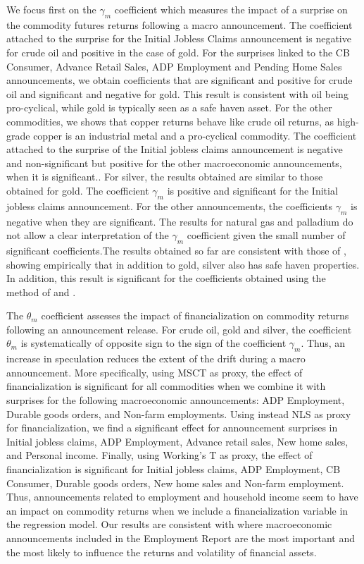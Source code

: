 \documentclass[12pt]{article}
\begin{document}
We focus first on the $\gamma_m$ coefficient which measures the impact of a surprise on the commodity futures returns following a macro announcement. The coefficient attached to the surprise for the Initial Jobless Claims announcement is negative for crude oil and positive in the case of gold. For the surprises linked to the CB Consumer, Advance Retail Sales, ADP Employment and Pending Home Sales announcements, we obtain coefficients that are significant and positive for crude oil and significant and negative for gold. This result is consistent with oil being pro-cyclical, while gold is typically seen as a safe haven asset. For the other commodities, we shows that copper returns behave like crude oil returns, as high-grade copper is an industrial metal and a pro-cyclical commodity. The coefficient attached to the surprise of the Initial jobless claims announcement is negative and non-significant but positive for the other macroeconomic announcements, when it is significant.. For silver, the results obtained are similar to those obtained for gold. The coefficient $\gamma_m$ is positive and significant for the Initial jobless claims announcement. For the other announcements, the coefficients $\gamma_m$ is negative when they are significant. The results for natural gas and palladium do not allow a clear interpretation of the $\gamma_m$ coefficient given the small number of significant coefficients.The results obtained so far are consistent with those of \citet{lucey2015precious}, showing empirically that in addition to gold, silver also has safe haven properties.
In addition, this result is significant for the coefficients obtained using the method of \citet{kurov2019price} and \citet{andersen2007real}.

The $\theta_m$ coefficient assesses the impact of financialization on commodity returns following an announcement release. For crude oil, gold and silver, the coefficient $\theta_m$ is systematically of opposite sign to the sign of the coefficient $\gamma_m$. Thus, an increase in speculation reduces the extent of the drift during a macro  announcement. More specifically, using MSCT as proxy, the effect of financialization is significant for all commodities when we combine it with surprises for the following macroeconomic announcements: ADP Employment, Durable goods orders, and Non-farm employments. Using instead NLS as proxy for financialization, we find a significant effect for announcement surprises in Initial jobless claims, ADP Employment, Advance retail sales, New home sales, and Personal income. Finally, using Working's T as proxy, the effect of financialization is significant for  Initial jobless claims, ADP Employment, CB Consumer, Durable goods orders, New home sales and Non-farm employment. Thus,  announcements related to employment and household income seem to have an impact on commodity returns when we include a financialization variable in the regression model. Our results are consistent with \citet{hordahl2015expectations} where macroeconomic announcements included in the Employment Report are the most important and the most likely to influence the returns and  volatility of financial assets.
  
\end{document}
